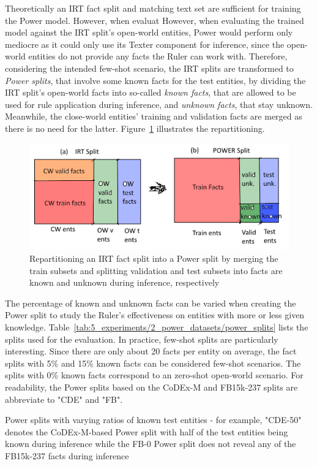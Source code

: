 Theoretically an IRT fact split and matching text set are sufficient for training the Power model. However, when evaluat However, when evaluating the trained model against the IRT split's open-world entities, Power would perform only mediocre as it could only use its Texter component for inference, since the open-world entities do not provide any facts the Ruler can work with. Therefore, considering the intended few-shot scenario, the IRT splits are transformed to \emph{Power splits}, that involve some known facts for the test entities, by dividing the IRT split's open-world facts into so-called \emph{known facts}, that are allowed to be used for rule application during inference, and \emph{unknown facts}, that stay unknown. Meanwhile, the close-world entities' training and validation facts are merged as there is no need for the latter. Figure~\ref{fig:5_experiments/2_power_datasets/splits} illustrates the repartitioning.

\begin{figure}[t]
    \centering
    \includegraphics[width=\textwidth]{5_experiments/2_power_datasets/splits}
    \caption{Repartitioning an IRT fact split into a Power split by merging the train subsets and splitting validation and test subsets into facts are known and unknown during inference, respectively}
    \label{fig:5_experiments/2_power_datasets/splits}
\end{figure}

The percentage of known and unknown facts can be varied when creating the Power split to study the Ruler's effectiveness on entities with more or less given knowledge. Table~\ref{tab:5_experiments/2_power_datasets/power_splits} lists the splits used for the evaluation. In practice, few-shot splits are particularly interesting. Since there are only about 20 facts per entity on average, the fact splits with 5\% and 15\% known facts can be considered few-shot scenarios. The splits with 0\% known facts correspond to an zero-shot open-world scenario. For readability, the Power splits based on the CoDEx-M and FB15k-237 splits are abbreviate to "CDE" and "FB".

\begin{table}[h]
    \centering
    
    \caption{Power splits with varying ratios of known test entities - for example, "CDE-50" denotes the CoDEx-M-based Power split with half of the test entities being known during inference while the FB-0 Power split does not reveal any of the FB15k-237 facts during inference}
    \label{tab:5_experiments/2_power_datasets/power_splits}
\end{table}
